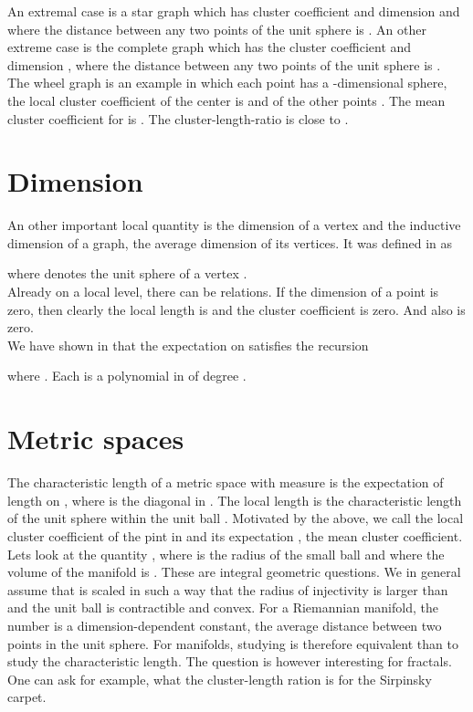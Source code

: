 \documentclass[12pt]{amsart}
\theoremstyle{definition}
\begin{document}
An extremal case is a star graph  which has cluster coefficient  and dimension 
and where the distance between any two points of the unit sphere is . 
An other extreme case is the complete graph  which has the cluster coefficient 
and dimension , where the distance between any two points of the unit sphere is .  \\

The wheel graph  is an example in which each point has a -dimensional sphere,
the local cluster coefficient of the center is  and of the other points . 
The mean cluster coefficient for  is . 
The cluster-length-ratio  is close to . 

\section{Dimension} 

An other important local quantity is the dimension  of a vertex
and the inductive dimension of a graph, the average dimension of its vertices. 
It was defined in \cite{elemente11} as

where  
denotes the unit sphere of a vertex . \\

Already on a local level, there can be relations. If the dimension of a point is zero, 
then clearly the local length  is  and the cluster coefficient is zero. And
also  is zero.  \\
We have shown in \cite{randomgraph} 
that the expectation  on  satisfies the recursion 

where . Each  is a polynomial in  of degree .

\section{Metric spaces}

The characteristic length  of a metric space  with measure 
is the expectation of length  on , where  is the 
diagonal  in . The local length 
is the characteristic length of the unit sphere  within the unit
ball . Motivated by the above, we call  the local cluster coefficient
of the pint in  and its expectation , the mean cluster coefficient. 
Lets look at the quantity , where  is the radius of the small ball and
where the volume of the manifold is . These are integral geometric questions. We 
in general assume that  is scaled in such a way that the radius of injectivity is 
larger than  and the unit ball is contractible and convex. For a Riemannian manifold, the
number  is a dimension-dependent constant, the average distance between two points in the
unit sphere. For manifolds, studying  is therefore equivalent than to study the 
characteristic length. The question is however interesting for fractals. One can ask for
example, what the cluster-length ration  is for the Sirpinsky carpet. \\
\end{document}
